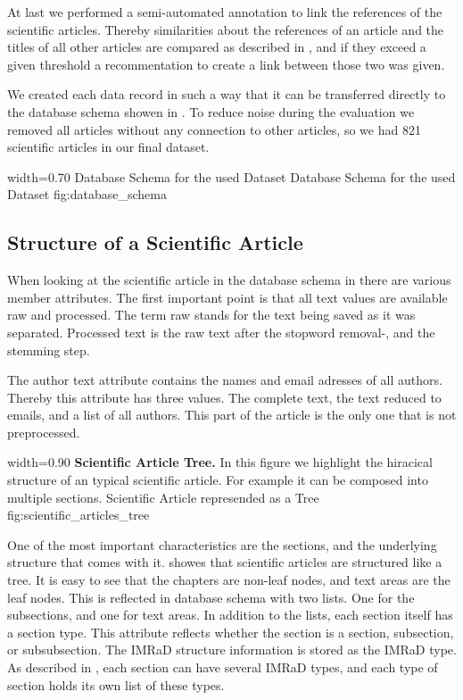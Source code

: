 At last we performed a semi-automated annotation to link the references of the scientific articles. Thereby similarities about the references of an article and the titles of all other articles are compared as described in , and if they exceed a given threshold a recommentation to create a link between those two was given.

We created each data record in such a way that it can be transferred directly to the database schema showen in . To reduce noise during the evaluation we removed all articles without any connection to other articles, so we had 821 scientific articles in our final dataset.

      {width=0.70\textwidth}
      {Database Schema for the used Dataset}
      {Database Schema for the used Dataset}
      {fig:database_schema}

\subsection{Structure of a Scientific Article}
\label{sec:structure_scientific_article}

When looking at the scientific article in the database schema in  there are various member attributes. The first important point is that all text values are available raw and processed. The term raw stands for the text being saved as it was separated. Processed text is the raw text after the stopword removal-, and the stemming step.

The author text attribute contains the names and email adresses of all authors. Thereby this attribute has three values. The complete text, the text reduced to emails, and a list of all authors. This part of the article is the only one that is not preprocessed.

      {width=0.90\textwidth}
      {\textbf{Scientific Article Tree.} In this figure we highlight the hiracical structure of an typical scientific article. For example it can be composed into multiple sections.}
      {Scientific Article represended as a Tree}
      {fig:scientific_articles_tree}

One of the most important characteristics are the sections, and the underlying structure that comes with it.  showes that scientific articles are structured like a tree. It is easy to see that the chapters are non-leaf nodes, and text areas are the leaf nodes. This is reflected in database schema with two lists. One for the subsections, and one for text areas. In addition to the lists, each section itself has a section type. This attribute reflects whether the section is a section, subsection, or subsubsection. The IMRaD structure information is stored as the IMRaD type. As described in , each section can have several IMRaD types, and each type of section holds its own list of these types.

